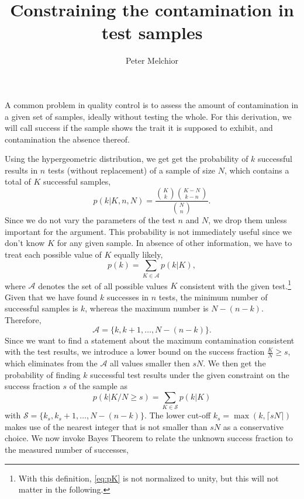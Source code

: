 \documentclass[11pt]{scrartcl}
\title{Constraining the contamination in test samples}
\author{Peter Melchior}
\begin{document}
\maketitle

A common problem in quality control is to assess the amount of contamination in a given set of samples, ideally without testing the whole. For this derivation, we will call success if the sample shows the trait it is supposed to exhibit, and contamination the absence thereof.

Using the hypergeometric distribution, we get get the probability of $k$ successful results in $n$ tests (without replacement) of a sample of size $N$, which contains a total of $K$ successful samples,
\begin{equation}
p(k | K,n,N) = \frac{\binom{K}{k}\binom{K-N}{k-n}}{\binom{N}{n}}.
\end{equation}
Since we do not vary the parameters of the test $n$ and $N$, we drop them unless important for the argument. This probability is not immediately useful since we don't know $K$ for any given sample. In absence of other information, we have to treat each possible value of $K$ equally likely,
\begin{equation}
\label{eq:pK}
p(k) = \sum_{K\in \mathcal{A}} p(k | K),
\end{equation}
where $\mathcal{A}$ denotes the set of all possible values $K$ consistent with the given test.\footnote{With this definition, \autoref{eq:pK} is not normalized to unity, but this will not matter in the following.}
Given that we have found $k$ successes in $n$ tests, the minimum number of successful samples is $k$, whereas the maximum number is $N-(n-k)$. Therefore,
\begin{equation}
\mathcal{A} = \lbrace k, k + 1, \dotsc, N-(n-k)\rbrace.
\end{equation}
Since we want to find a statement about the maximum contamination consistent with the test results, we introduce a lower bound on the success fraction $\tfrac{K}{N} \geq s$, which eliminates from the $\mathcal{A}$ all values smaller then $sN$. We then get the probability of finding $k$ successful test results under the given constraint on the success fraction $s$ of the sample as
\begin{equation}
p(k | K/N\geq s) = \sum_{K\in \mathcal{S}} p(k | K)
\end{equation}
with $\mathcal{S} = \lbrace{k_s, k_s+1, \dotsc, N-(n-k)\rbrace}$. The lower cut-off $k_s = \max(k, \lceil sN\rceil)$ makes use of the nearest integer that is not smaller than $sN$ as a conservative choice. We now invoke Bayes Theorem to relate the unknown success fraction to the measured number of successes,
\end{document}
